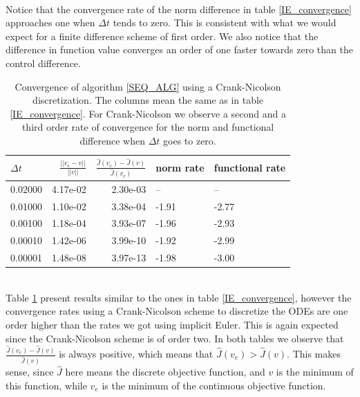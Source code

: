 \\
Notice that the convergence rate of the norm difference in table \ref{IE_convergence} approaches one when $\Delta t$ tends to zero. This is consistent with what we would expect for a finite difference scheme of first order. We also notice that the difference in function value converges an order of one faster towards zero than the control difference.  
\\
\begin{table}[!h]
\caption{Convergence of algorithm \ref{SEQ_ALG} using a Crank-Nicolson discretization. The columns mean the same as in table \ref{IE_convergence}. For Crank-Nicolson we observe a second and a third order rate of convergence for the norm and functional difference when $\Delta t$ goes to zero.} \label{CN_convergence}
\centering
\begin{tabular}{lrrll}
\toprule
{} $\Delta t$&    $\frac{||v_e-v||}{||v||}$ &  $\frac{\hat J(v_e)-\hat J(v)}{\hat J(v_e)}$ &   norm rate &    functional rate \\
\midrule
0.02000 &  4.17e-02 &  2.30e-03 &       -- &       -- \\
0.01000 &  1.10e-02 &  3.38e-04 &  -1.91 & -2.77 \\
0.00100 &  1.18e-04 &  3.93e-07 & -1.96 & -2.93 \\
0.00010 &  1.42e-06 &  3.99e-10 & -1.92 & -2.99 \\
0.00001 &  1.48e-08 &  3.97e-13 & -1.98 &  -3.00 \\
\bottomrule
\end{tabular}
\end{table}
\\
Table \ref{CN_convergence} present results similar to the ones in table \ref{IE_convergence}, however the convergence rates using a Crank-Nicolson scheme to discretize the ODEs are one order higher than the rates we got using implicit Euler. This is again expected since the Crank-Nicolson scheme is of order two. In both tables we observe that $\frac{\hat J(v_e)-\hat J(v)}{\hat J(v)}$ is always positive, which means that $\hat J(v_e)>\hat J(v)$. This makes sense, since $\hat J$ here means the discrete objective function, and $v$ is the minimum of this function, while $v_e$ is the minimum of the continuous objective function.  
